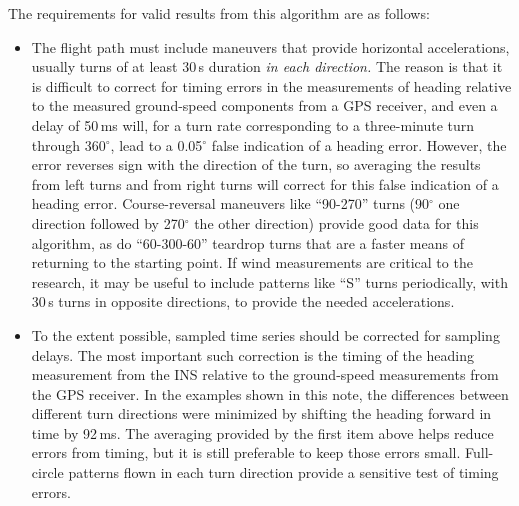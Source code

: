 \documentclass[12pt,twoside,english,12pt,twoside,english]{article}\usepackage[]{graphicx}\usepackage[]{color}
\let\OrgIndex\index
\renewcommand*{\index}[1]{\OrgIndex{#1}}
\begin{document}
The requirements for valid
results from this algorithm
are as follows:
\begin{itemize}
\item The flight path must include maneuvers
that provide horizontal accelerations,
usually turns of at least 30\,s duration \emph{in each direction.}
The reason is that it is difficult to correct for timing
errors in the measurements of heading relative to
the measured ground-speed components from a GPS
receiver, and even a delay of 50\,ms will, for a
turn rate corresponding to a three-minute turn through 360$^{\circ}$,
lead to a 0.05$^{\circ}$ false indication of a heading error.
However, the error reverses sign with the direction of the turn, so
averaging the results from left turns and from right turns will correct
for this false indication of a heading error. Course-reversal maneuvers
like ``90-270'' turns (90$^{\circ}$ one direction followed by 270$^{\circ}$
the other direction) provide good data for this algorithm, as do ``60-300-60''
teardrop turns that are a faster means of returning to the starting
point. If wind measurements
are critical to the research, it may be useful to include patterns
like ``S'' turns periodically, with 30\,s turns in opposite directions,
to provide the needed accelerations. 
\item To the extent possible, sampled time series should be corrected for
sampling delays. The most important such correction
is the timing of the heading measurement
from the INS relative to
the ground-speed measurements from the GPS
receiver. In the examples shown in this note, the differences between
different turn directions were minimized by shifting the heading forward
in time by 92\,ms. The averaging provided by the first item above
helps reduce errors from timing, but it is still
preferable to keep those errors small. Full-circle patterns
flown in each turn direction provide a sensitive test of timing errors.
\end{itemize}
\end{document}
